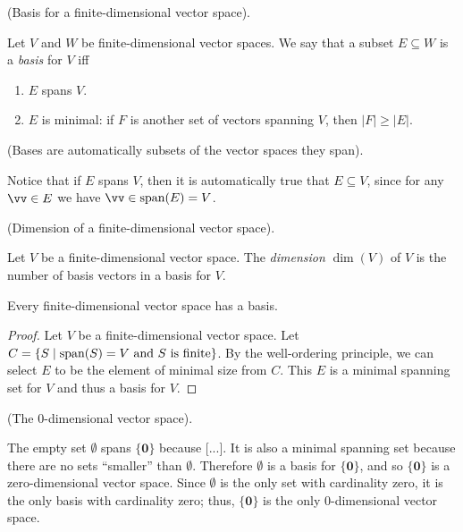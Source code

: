\begin{defn}
    (Basis for a finite-dimensional vector space). 
    
    Let $V$ and $W$ be finite-dimensional vector spaces. We say that a subset $E \subseteq W$ is a \textit{basis} for $V$ iff
    
    \begin{enumerate}
        \item $E$ spans $V$.
        \item $E$ is minimal: if $F$ is another set of vectors spanning $V$, then $|F| \geq |E|$.
    \end{enumerate}
\end{defn}

\begin{remark}
    (Bases are automatically subsets of the vector spaces they span).

    Notice that if $E$ spans $V$, then it is automatically true that $E \subseteq V$, since for any $\vv \in E$ we have ${\vv \in \spann(E) = V}$.
\end{remark}

\begin{defn}
    (Dimension of a finite-dimensional vector space).
    
    Let $V$ be a finite-dimensional vector space. The \textit{dimension} $\dim(V)$ of $V$ is the number of basis vectors in a basis for $V$.
\end{defn}

\begin{theorem}
    Every finite-dimensional vector space has a basis.
\end{theorem}

\begin{proof}
    Let $V$ be a finite-dimensional vector space. Let $C = \{S \mid \text{span}(S) = V \text{ and $S$ is finite} \}$. By the well-ordering principle, we can select $E$ to be the element of minimal size from $C$. This $E$ is a minimal spanning set for $V$ and thus a basis for $V$.
\end{proof}

\begin{remark}
\label{ch::lin_alg::rmk::zero_dim_vector_space}
    (The $0$-dimensional vector space). 
    
    The empty set $\emptyset$ spans $\{\mathbf{0}\}$ because [...]. It is also a minimal spanning set because there are no sets ``smaller'' than $\emptyset$. Therefore $\emptyset$ is a basis for $\{\mathbf{0}\}$, and so $\{\mathbf{0}\}$ is a zero-dimensional vector space. Since $\emptyset$ is the only set with cardinality zero, it is the only basis with cardinality zero; thus, $\{\mathbf{0}\}$ is the only $0$-dimensional vector space.
\end{remark}

